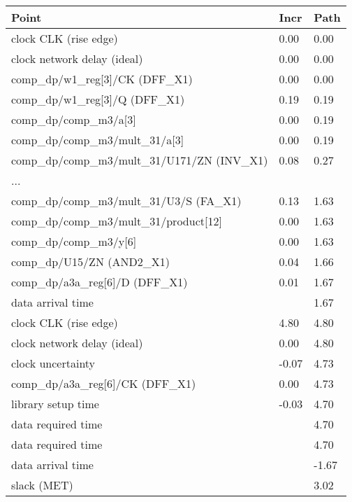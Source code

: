 \begin{tabular}{|lll|}\hline
Point                                      &             Incr    &   Path\\\hline
  clock CLK (rise edge)                                 &  0.00    &   0.00\\
  clock network delay (ideal)                          &   0.00     &  0.00\\
  comp\_dp/w1\_reg[3]/CK (DFF\_X1)                         &  0.00    &   0.00 \\
  comp\_dp/w1\_reg[3]/Q (DFF\_X1)                          &  0.19    &   0.19 \\
  comp\_dp/comp\_m3/a{[3]}   				& 0.00     &  0.19 \\
  comp\_dp/comp\_m3/mult\_31/a{[3]}                          &  0.00    &   0.19 \\
  comp\_dp/comp\_m3/mult\_31/U171/ZN (INV\_X1)               & 0.08    &   0.27 \\
  ...& &\\
  comp\_dp/comp\_m3/mult\_31/U3/S (FA\_X1)                    &0.13    &   1.63 \\
  comp\_dp/comp\_m3/mult\_31/product{[12]}       &0.00 &      1.63 \\
  comp\_dp/comp\_m3/y{[6]}  &0.00     &  1.63 \\
  comp\_dp/U15/ZN (AND2\_X1)                              &  0.04    &   1.66 \\
  comp\_dp/a3a\_reg[6]/D (DFF\_X1)                          & 0.01    &   1.67 \\
  data arrival time                                      & &            1.67\\
\hline
  clock CLK (rise edge)                                &   4.80   &    4.80\\
  clock network delay (ideal)                          &   0.00   &    4.80\\
  clock uncertainty                                    &  -0.07   &    4.73\\
  comp\_dp/a3a\_reg{[6]}/CK (DFF\_X1)                       &   0.00  &    4.73 \\
  library setup time                                   &  -0.03  &     4.70\\
  data required time                                   &          &    4.70\\
  \hline
  data required time                                    &         &    4.70\\
  data arrival time                                       &        &  -1.67\\
  \hline
  slack (MET)                                             &        &   3.02\\\hline
\end{tabular}